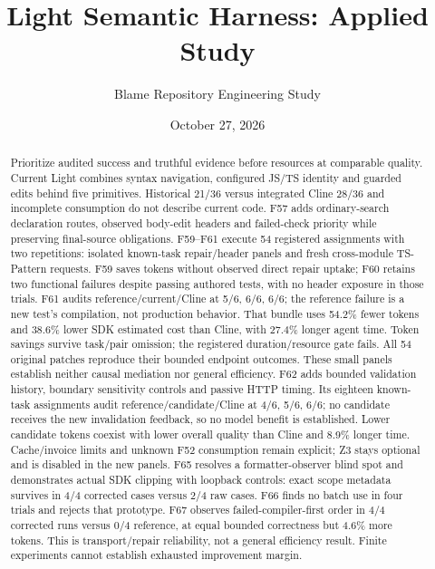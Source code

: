 \documentclass[11pt,a4paper]{article}
\title{Light Semantic Harness: Applied Study}
\author{Blame Repository Engineering Study}
\date{October 27, 2026}
\begin{document}
\maketitle
\begin{abstract}
Prioritize audited success and truthful evidence before resources at comparable
quality. Current Light combines syntax navigation, configured JS/TS identity
and guarded edits behind five primitives. Historical 21/36 versus integrated
Cline 28/36 and incomplete consumption do not describe current code. F57 adds
ordinary-search declaration routes, observed body-edit headers and failed-check
priority while preserving final-source obligations. F59--F61 execute 54 registered
assignments with two repetitions: isolated known-task repair/header panels and
fresh cross-module TS-Pattern requests. F59 saves tokens without observed direct
repair uptake; F60 retains two functional failures despite passing authored tests,
with no header exposure in those trials. F61 audits reference/current/Cline at
5/6, 6/6, 6/6; the reference failure is a new test's compilation, not production
behavior. That bundle uses 54.2\% fewer tokens and 38.6\% lower SDK estimated
cost than Cline, with 27.4\% longer agent time. Token savings survive task/pair
omission; the registered duration/resource gate fails. All 54 original patches
reproduce their bounded endpoint outcomes. These small panels establish neither
causal mediation nor general efficiency. F62 adds bounded validation history,
boundary sensitivity controls and passive HTTP timing. Its eighteen known-task
assignments audit reference/candidate/Cline at 4/6, 5/6, 6/6; no candidate receives
the new invalidation feedback, so no model benefit is established. Lower candidate
tokens coexist with lower overall quality than Cline and 8.9\% longer time.
Cache/invoice limits and unknown F52
consumption remain explicit; Z3 stays optional and is disabled in the new panels.
F65 resolves a formatter-observer blind spot and demonstrates actual SDK clipping
with loopback controls: exact scope metadata survives in 4/4 corrected cases
versus 2/4 raw cases. F66 finds no batch use in four trials and rejects that
prototype. F67 observes failed-compiler-first order in 4/4 corrected runs versus
0/4 reference, at equal bounded correctness but 4.6\% more tokens.
This is transport/repair reliability, not a general efficiency result.
Finite experiments cannot establish exhausted improvement margin.
\end{abstract}
\end{document}
